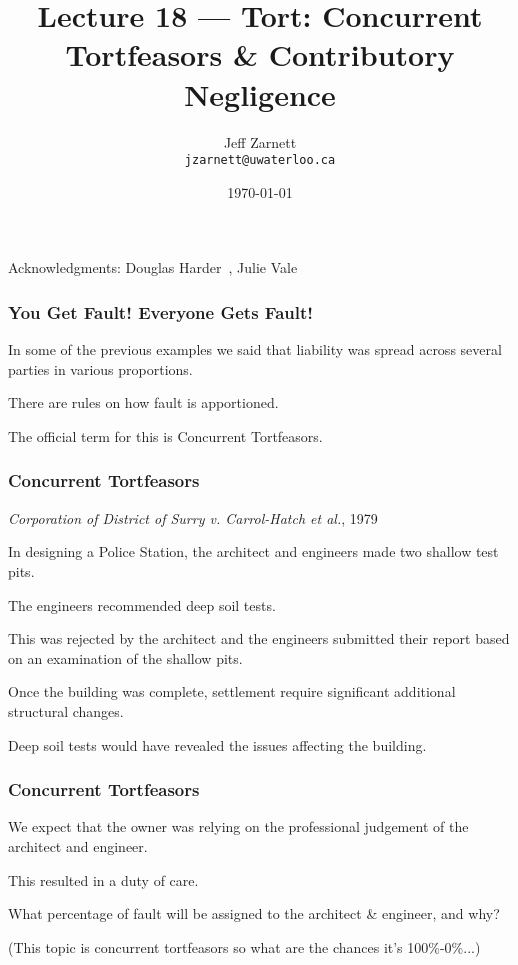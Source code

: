 

\title{Lecture 18 --- Tort: Concurrent Tortfeasors \& Contributory Negligence }

\author{Jeff Zarnett \\ \small \texttt{jzarnett@uwaterloo.ca}}
\date{\today}




\begin{frame}
  \titlepage

\begin{center}
  \small{Acknowledgments: Douglas Harder~\cite{dwh}, Julie Vale~\cite{jv}}
  \end{center}
\end{frame}



\begin{frame}
\frametitle{You Get Fault! Everyone Gets Fault!}

In some of the previous examples we said that liability was spread across several parties in various proportions.

There are rules on how fault is apportioned.

The official term for this is \alert{Concurrent Tortfeasors}.

\end{frame}



\begin{frame}
\frametitle{Concurrent Tortfeasors}

\textit{Corporation of District of Surry v. Carrol-Hatch et al.}, 1979

In designing a Police Station, the architect and engineers made two shallow test pits.

The engineers recommended deep soil tests.

This was rejected by the architect and the engineers submitted their report based on an examination of the shallow pits.

Once the building was complete, settlement require significant additional structural changes.

Deep soil tests would have revealed the issues affecting the building.

\end{frame}




\begin{frame}
\frametitle{Concurrent Tortfeasors}

We expect that the owner was relying on the professional judgement of the architect and engineer.

This resulted in a duty of care.

What percentage of fault will be assigned to the architect \& engineer, and why?

(This topic is concurrent tortfeasors so what are the chances it's 100\%-0\%...)

\end{frame}



